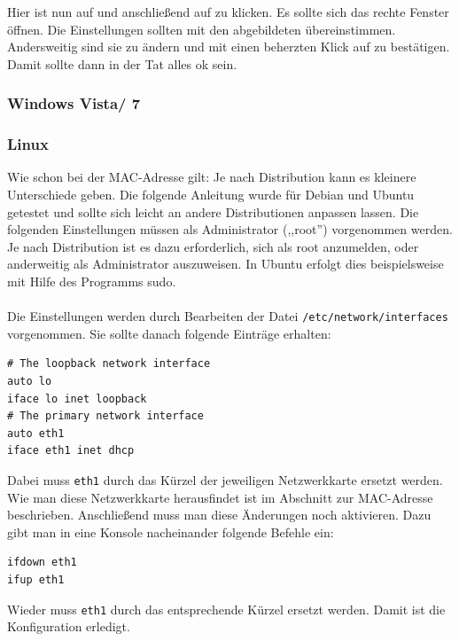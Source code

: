 Hier ist nun auf  und anschließend
auf  zu klicken. Es sollte sich das rechte Fenster
öffnen.
Die Einstellungen sollten mit den abgebildeten
übereinstimmen. Andersweitig sind sie zu ändern und mit einen
beherzten Klick auf  zu bestätigen. Damit sollte dann in der
Tat alles ok sein.
\subsubsection{Windows Vista/ 7}

\subsubsection{Linux}
\small{Wie schon bei der MAC-Adresse gilt: Je nach Distribution kann es kleinere Unterschiede
geben. Die folgende Anleitung wurde für Debian und Ubuntu getestet und
sollte sich leicht an andere Distributionen anpassen lassen.}
Die folgenden Einstellungen müssen als Administrator (,,root'') vorgenommen
werden. Je nach Distribution ist es dazu erforderlich, sich als root
anzumelden, oder anderweitig als Administrator auszuweisen. In Ubuntu
erfolgt dies beispielsweise mit Hilfe des Programms sudo.\\\\
Die Einstellungen werden durch Bearbeiten der Datei
\texttt{/etc/network/interfaces} vorgenommen. Sie sollte danach
folgende Einträge erhalten:
\begin{verbatim}
# The loopback network interface
auto lo 
iface lo inet loopback
# The primary network interface
auto eth1
iface eth1 inet dhcp 
\end{verbatim}
Dabei muss \texttt{eth1} durch das Kürzel der jeweiligen Netzwerkkarte
ersetzt werden. Wie man diese Netzwerkkarte herausfindet ist im
Abschnitt zur MAC-Adresse beschrieben. Anschließend muss man diese
Änderungen noch aktivieren. Dazu gibt man in eine Konsole nacheinander
folgende Befehle ein:
\begin{verbatim}
ifdown eth1
ifup eth1
\end{verbatim}
Wieder muss \texttt{eth1} durch das entsprechende Kürzel ersetzt
werden. Damit ist die Konfiguration erledigt.

